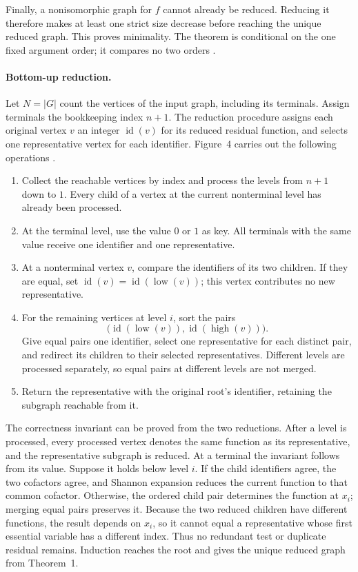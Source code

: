Finally, a nonisomorphic graph for \(f\) cannot already be reduced.
Reducing it therefore makes at least one strict size decrease
before reaching the unique reduced graph. This proves minimality.
The theorem is conditional on the one fixed argument order;
it compares no two orders
\cite[thm.~1]{Bryant1986}.

\paragraph{Bottom-up reduction.}
Let \(N=|G|\) count the vertices of the input graph, including its terminals.
Assign terminals the bookkeeping index \(n+1\). The reduction procedure
assigns each original vertex \(v\) an integer \(\operatorname{id}(v)\) for
its reduced residual function, and selects one representative vertex for
each identifier. Figure~4 carries out the following operations
\cite[\S4.2 and fig.~4]{Bryant1986}.

\begin{enumerate}
\item Collect the reachable vertices by index and process the levels from
\(n+1\) down to \(1\). Every child of a vertex at the current nonterminal
level has already been processed.
\item At the terminal level, use the value \(0\) or \(1\) as key. All
terminals with the same value receive one identifier and one representative.
\item At a nonterminal vertex \(v\), compare the identifiers of its two
children. If they are equal, set
\(\operatorname{id}(v)=\operatorname{id}(\operatorname{low}(v))\);
this vertex contributes no new representative.
\item For the remaining vertices at level \(i\), sort the pairs
\[
 \bigl(\operatorname{id}(\operatorname{low}(v)),
       \operatorname{id}(\operatorname{high}(v))\bigr).
\]
Give equal pairs one identifier, select one representative for each distinct
pair, and redirect its children to their selected representatives. Different
levels are processed separately, so equal pairs at different levels are not
merged.
\item Return the representative with the original root's identifier, retaining
the subgraph reachable from it.
\end{enumerate}

The correctness invariant can be proved from the two reductions. After a
level is processed, every processed vertex denotes the same function as its
representative, and the representative subgraph is reduced. At a terminal
the invariant follows from its value. Suppose it holds below level \(i\).
If the child identifiers agree, the two cofactors agree, and Shannon
expansion reduces the current function to that common cofactor. Otherwise,
the ordered child pair determines the function at \(x_i\); merging equal
pairs preserves it. Because the two reduced children have different
functions, the result depends on \(x_i\), so it cannot equal a representative
whose first essential variable has a different index. Thus no redundant
test or duplicate residual remains. Induction reaches the root and gives the
unique reduced graph from Theorem~1.

